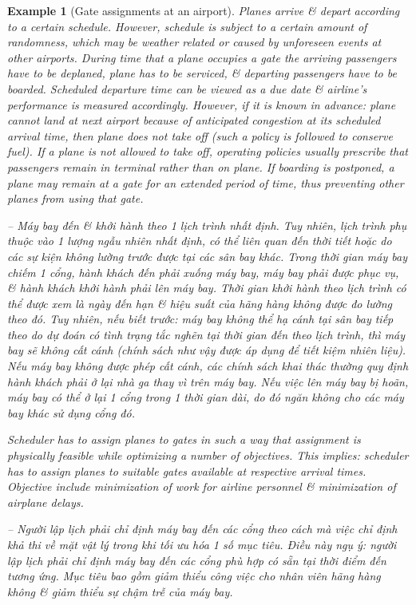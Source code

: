 \documentclass{article}
\newtheorem{example}{Example}
\begin{document}
\begin{itemize}
\begin{itemize}
\begin{example}[Gate assignments at an airport]
            Planes arrive \& depart according to a certain schedule. However, schedule is subject to a certain amount of randomness, which may be weather related or caused by unforeseen events at other airports. During time that a plane occupies a gate the arriving passengers have to be deplaned, plane has to be serviced, \& departing passengers have to be boarded. Scheduled departure time can be viewed as a due date \& airline's performance is measured accordingly. However, if it is known in advance: plane cannot land at next airport because of anticipated congestion at its scheduled arrival time, then plane does not take off (such a policy is followed to conserve fuel). If a plane is not allowed to take off, operating policies usually prescribe that passengers remain in terminal rather than on plane. If boarding is postponed, a plane may remain at a gate for an extended period of time, thus preventing other planes from using that gate.

            -- Máy bay đến \& khởi hành theo 1 lịch trình nhất định. Tuy nhiên, lịch trình phụ thuộc vào 1 lượng ngẫu nhiên nhất định, có thể liên quan đến thời tiết hoặc do các sự kiện không lường trước được tại các sân bay khác. Trong thời gian máy bay chiếm 1 cổng, hành khách đến phải xuống máy bay, máy bay phải được phục vụ, \& hành khách khởi hành phải lên máy bay. Thời gian khởi hành theo lịch trình có thể được xem là ngày đến hạn \& hiệu suất của hãng hàng không được đo lường theo đó. Tuy nhiên, nếu biết trước: máy bay không thể hạ cánh tại sân bay tiếp theo do dự đoán có tình trạng tắc nghẽn tại thời gian đến theo lịch trình, thì máy bay sẽ không cất cánh (chính sách như vậy được áp dụng để tiết kiệm nhiên liệu). Nếu máy bay không được phép cất cánh, các chính sách khai thác thường quy định hành khách phải ở lại nhà ga thay vì trên máy bay. Nếu việc lên máy bay bị hoãn, máy bay có thể ở lại 1 cổng trong 1 thời gian dài, do đó ngăn không cho các máy bay khác sử dụng cổng đó.

            Scheduler has to assign planes to gates in such a way that assignment is physically feasible while optimizing a number of objectives. This implies: scheduler has to assign planes to suitable gates available at respective arrival times. Objective include minimization of work for airline personnel \& minimization of airplane delays.

            -- Người lập lịch phải chỉ định máy bay đến các cổng theo cách mà việc chỉ định khả thi về mặt vật lý trong khi tối ưu hóa 1 số mục tiêu. Điều này ngụ ý: người lập lịch phải chỉ định máy bay đến các cổng phù hợp có sẵn tại thời điểm đến tương ứng. Mục tiêu bao gồm giảm thiểu công việc cho nhân viên hãng hàng không \& giảm thiểu sự chậm trễ của máy bay.


\end{example}
\end{itemize}
\end{itemize}
\end{document}

